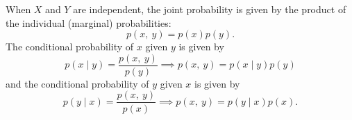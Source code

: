 \documentclass{article}
\begin{document}
When \(X\) and \(Y\) are independent, the joint probability is given by
the product of the individual (marginal) probabilities:
\begin{equation*}
    p\left( x,\: y \right) = p\left( x \right) p\left( y \right).
\end{equation*}
The conditional probability of \(x\) given \(y\) is given by
\begin{equation*}
    p\left( x \mid y \right) = \frac{p\left( x,\: y \right)}{p\left( y \right)} \implies p\left( x,\: y \right) = p\left( x \mid y \right) p\left( y \right)
\end{equation*}
and the conditional probability of \(y\) given \(x\) is given by
\begin{equation*}
    p\left( y \mid x \right) = \frac{p\left( x,\: y \right)}{p\left( x \right)} \implies p\left( x,\: y \right) = p\left( y \mid x \right) p\left( x \right).
\end{equation*}
\end{document}
